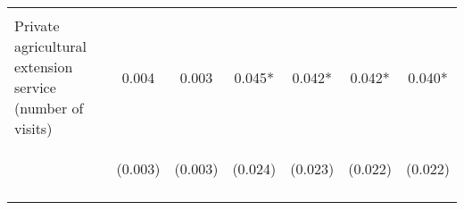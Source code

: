 \begin{center}
\begin{tabular}{lcccccc}
\vspace{4pt} & \begin{footnotesize}[0.355]\end{footnotesize} & \begin{footnotesize}[0.190]\end{footnotesize} & \begin{footnotesize}[0.148]\end{footnotesize} & \begin{footnotesize}[0.265]\end{footnotesize} & \begin{footnotesize}[0.102]\end{footnotesize} & \begin{footnotesize}[0.191]\end{footnotesize} \\
Private agricultural extension service (number of visits) & 0.004 & 0.003 & 0.045* & 0.042* & 0.042* & 0.040* \\
 & \begin{footnotesize}(0.003)\end{footnotesize} & \begin{footnotesize}(0.003)\end{footnotesize} & \begin{footnotesize}(0.024)\end{footnotesize} & \begin{footnotesize}(0.023)\end{footnotesize} & \begin{footnotesize}(0.022)\end{footnotesize} & \begin{footnotesize}(0.022)\end{footnotesize} \\
\vspace{4pt} & \begin{footnotesize}[0.313]\end{footnotesize} & \begin{footnotesize}[0.334]\end{footnotesize} & \begin{footnotesize}[0.057]\end{footnotesize} & \begin{footnotesize}[0.071]\end{footnotesize} & \begin{footnotesize}[0.052]\end{footnotesize} & \begin{footnotesize}[0.066]\end{footnotesize} \\

\end{tabular}
\end{center}
